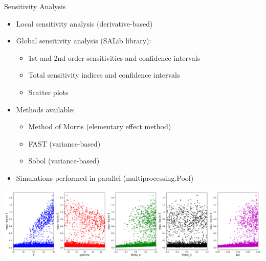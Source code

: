 \documentclass[compress,newPxFont,sthlmFooter]{beamer}
\begin{document}
\begin{frame}[plain]{Sensitivity Analysis}
    \begin{itemize}
      \item \alert{Local sensitivity analysis} (derivative-based)
      \item \alert{Global sensitivity analysis} (SALib library):
        \begin{itemize}
          \item 1st and 2nd order sensitivities and confidence intervals
          \item Total sensitivity indices and confidence intervals
          \item Scatter plots
        \end{itemize}
      \item Methods available:
        \begin{itemize}
          \item \alert{Method of Morris} (elementary effect method)
          \item \alert{FAST} (variance-based)
          \item \alert{Sobol} (variance-based)
        \end{itemize}
      \item Simulations performed in parallel (multiprocessing.Pool)
    \end{itemize}
    \begin{center}
        \includegraphics[align=c, height=0.25\paperheight]{sa_scatter_sobol.png}
    \end{center}
\end{frame}
\end{document}
